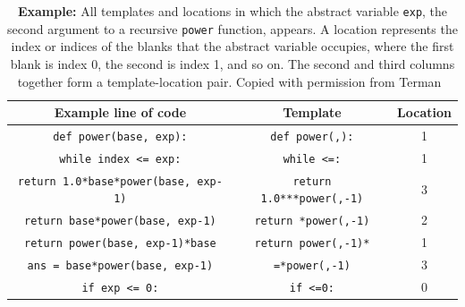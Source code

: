 \begin{table}
\centering
\caption*{\textbf{Example:} All templates and locations in which the abstract variable \texttt{exp}, the second argument to a recursive \texttt{power} function, appears. A location represents the index or indices of the blanks that the abstract variable occupies, where the first blank is index 0, the second is index 1, and so on. The second and third columns together form a template-location pair. Copied with permission from Terman~\cite{staceythesis}}
\begin{tabular}{|c|c|c|}
\hline
Example line of code & Template & Location \\
\hline
\texttt{def power(base, exp):} & \texttt{def power(\underline{\hspace{1em}},\underline{\hspace{1em}}):} & 1 \\
\hline
\texttt{while index <= exp:} & \texttt{while \underline{\hspace{1em}}<=\underline{\hspace{1em}}:} & 1 \\
\hline
\texttt{return 1.0*base*power(base, exp-1)} & \texttt{return 1.0*\underline{\hspace{1em}}*\underline{\hspace{1em}}*power(\underline{\hspace{1em}},\underline{\hspace{1em}}-1)} & 3 \\
\hline
\texttt{return base*power(base, exp-1)} & \texttt{return \underline{\hspace{1em}}*power(\underline{\hspace{1em}},\underline{\hspace{1em}}-1)} & 2 \\
\hline
\texttt{return power(base, exp-1)*base} & \texttt{return power(\underline{\hspace{1em}},\underline{\hspace{1em}}-1)*\underline{\hspace{1em}}} & 1 \\
\hline
\texttt{ans = base*power(base, exp-1)} & \texttt{\underline{\hspace{1em}}=\underline{\hspace{1em}}*power(\underline{\hspace{1em}},\underline{\hspace{1em}}-1)} & 3 \\
\hline
\texttt{if exp <= 0:} & \texttt{if \underline{\hspace{1em}}<=0:} & 0 \\

\end{tabular}
\end{table}
